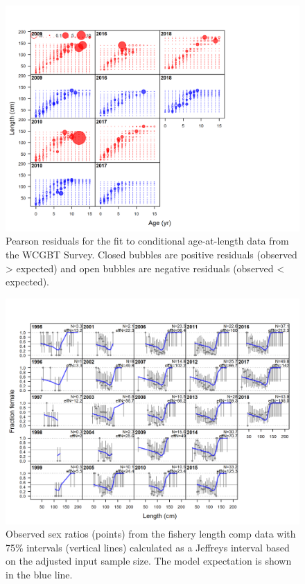 \documentclass[12pt,]{article}
\begin{document}
\begin{figure}
\centering
\includegraphics{r4ss/plots_mod1/comp_condAALfit_residsflt5mkt0.png}
\caption{Pearson residuals for the fit to conditional age-at-length data
from the WCGBT Survey. Closed bubbles are positive residuals (observed
\textgreater{} expected) and open bubbles are negative residuals
(observed \textless{} expected). \label{fig:age_fit_WCGBTS}}
\end{figure}

\begin{figure}
\centering
\includegraphics{r4ss/plots_mod1/sexratio_len_flt1mkt2.png}
\caption{Observed sex ratios (points) from the fishery length comp data
with 75\% intervals (vertical lines) calculated as a Jeffreys interval
based on the adjusted input sample size. The model expectation is shown
in the blue line.\label{fig:sexratio_len_flt1mkt2}}
\end{figure}
\end{document}
